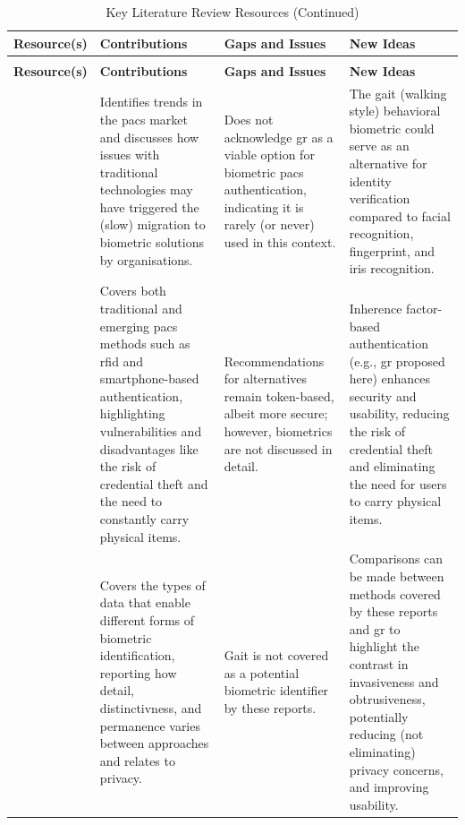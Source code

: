 \scriptsize
\begin{xltabular}{\textwidth}{|Y|Y|Y|Y|}
    \caption{Key Literature Review Resources}
    \label{tbl:literature-review-resources}\\
    \hline
    \textbf{Resource(s)} & \textbf{Contributions} & \textbf{Gaps and Issues} & \textbf{New Ideas} \\
    \hline
    \endfirsthead
    \caption*{Key Literature Review Resources (Continued)} \\
    \hline
    \textbf{Resource(s)} & \textbf{Contributions} & \textbf{Gaps and Issues} & \textbf{New Ideas} \\
    \hline
    \endhead
    \hline
    \endfoot

     & Identifies trends in the \ac{pacs} market and discusses how issues with traditional technologies may have triggered the (slow) migration to biometric solutions by organisations. & Does not acknowledge \ac{gr} as a viable option for biometric \ac{pacs} authentication, indicating it is rarely (or never) used in this context. & The gait (walking style) behavioral biometric could serve as an alternative for identity verification compared to facial recognition, fingerprint, and iris recognition. \\


     & Covers both traditional and emerging \ac{pacs} methods such as \ac{rfid} and smartphone-based authentication, highlighting vulnerabilities and disadvantages like the risk of credential theft and the need to constantly carry physical items. & Recommendations for alternatives remain token-based, albeit more secure; however, biometrics are not discussed in detail. & Inherence factor-based authentication (e.g., \ac{gr} proposed here) enhances security and usability, reducing the risk of credential theft and eliminating the need for users to carry physical items. \\

    \hline

     & Covers the types of data that enable different forms of biometric identification, reporting how detail, distinctivness, and permanence varies between approaches and relates to privacy. & Gait is not covered as a potential biometric identifier by these reports. & Comparisons can be made between methods covered by these reports and \ac{gr} to highlight the contrast in invasiveness and obtrusiveness, potentially reducing (not eliminating) privacy concerns, and improving usability. \\


\end{xltabular}
